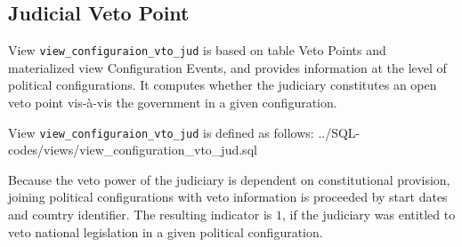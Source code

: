 \subsection{Judicial Veto Point}\label{view_configuration_vto_jud}

View \texttt{view\_configuraion\_vto\_jud} is based on table Veto Points and materialized view Configuration Events, and provides information at the level of political configurations.
It computes whether the judiciary constitutes an open veto point vis-\`{a}-vis the government in a given configuration.

View \texttt{view\_configuraion\_vto\_jud} is defined as follows:
%
{../SQL-codes/views/view_configuration_vto_jud.sql}

Because the veto power of the judiciary is dependent on constitutional provision,
joining political configurations with veto information is proceeded by start dates and country identifier.
The resulting indicator is $1$, if the judiciary was entitled to veto national legislation in a given political configuration.



